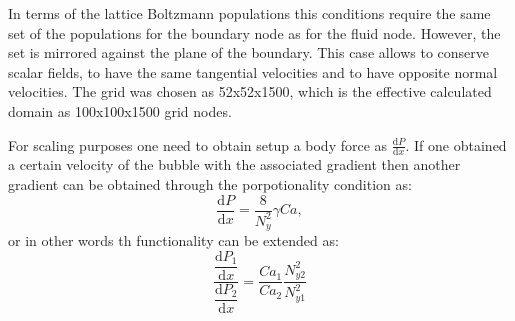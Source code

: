 \documentclass{article}
\begin{document}
In terms of the lattice Boltzmann populations this conditions require the same set of the
populations for the boundary node as for the fluid node. However, the set is mirrored against the
plane of the boundary. This case allows to conserve scalar fields, to have the same tangential
velocities and to have opposite normal velocities. The grid was chosen as 52x52x1500, which is the
effective calculated domain as 100x100x1500 grid nodes. 

\label{append:scaling}
For scaling purposes one need to obtain setup a body force as $\frac{\mathrm{d}P}{\mathrm{d}x}$. If
one obtained a certain velocity of the bubble with the associated gradient then another gradient
can be obtained through the porpotionality condition as:
\begin{equation}
\frac{\mathrm{d}P}{\mathrm{d}x}=\frac{8}{N_y^2} \gamma Ca,
\end{equation}
or in other words th functionality can be extended as:
\begin{equation}
\dfrac{\dfrac{\mathrm{d}P_1}{\mathrm{d}x}}{\dfrac{\mathrm{d}P_2}{\mathrm{d}x}}=\frac{Ca_1}{Ca_2}
\frac{N_{
y2}^2 }{N_{y1}^2}
\end{equation}




\end{document}
